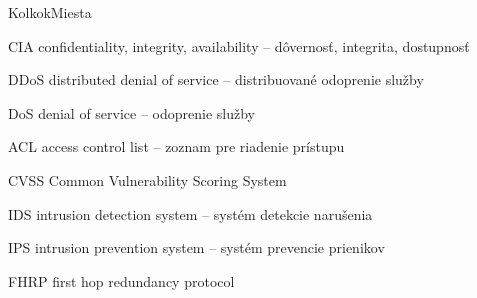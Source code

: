 \begin{seznamzkratek}{KolkokMiesta}

		{CIA} %
		{confidentiality, integrity, availability -- dôvernosť, integrita, dostupnosť} %

		{DDoS} %
		{distributed denial of service -- distribuované odoprenie služby} %
	
	{DoS} %
	{denial of service -- odoprenie služby} %

		{ACL} %
		{access control list -- zoznam pre riadenie prístupu} %

		{CVSS} %
		{Common Vulnerability Scoring System} %
		
		{IDS} %
		{intrusion detection system -- systém detekcie narušenia} %

		{IPS} %
		{intrusion prevention system -- systém prevencie prienikov} %

		{FHRP} %
		{first hop redundancy protocol} %
\end{seznamzkratek}
